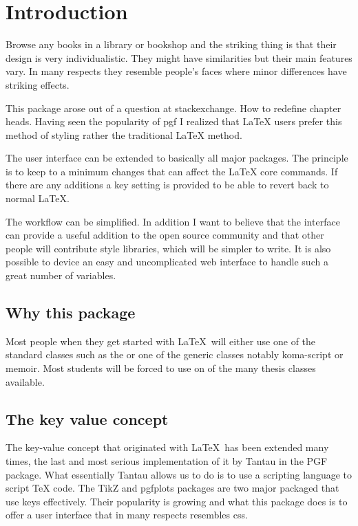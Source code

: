 \chapter{Introduction}

Browse any books in a library or bookshop and the striking thing is that their design is very individualistic. They might have similarities but their main features vary. In many respects they resemble people's faces where minor differences have striking effects.

This package arose out of a question at stackexchange. How to redefine chapter heads. Having seen the popularity of pgf I realized that LaTeX users prefer this method of styling rather the traditional LaTeX method.

The user interface can be extended to basically all major packages. The principle is to keep to a minimum changes that can affect the LaTeX core commands. If there are any additions a key setting is provided to be able to revert back to normal LaTeX.

The workflow can be simplified. In addition I want to believe that the interface can provide a useful addition to the open source community and that other people will contribute style libraries, which will be simpler to write. It is also possible
to device an easy and uncomplicated web interface to handle
such a great number of variables.

\section{Why this package}

Most people when they get started with \LaTeX\ will either use one of the standard classes such as the  or one of the generic classes notably koma-script or memoir. Most students will be forced to use on of the many thesis classes available.

\section{The key value concept}

The key-value concept that originated with \LaTeX\ has been extended many times, the last and most serious implementation of it by Tantau in the PGF package. What essentially Tantau allows us to do is to use a scripting language to script TeX code. The TikZ and pgfplots packages are two major packaged that use keys effectively. Their popularity is growing and what this package does is to offer a user interface that in many respects resembles css.


